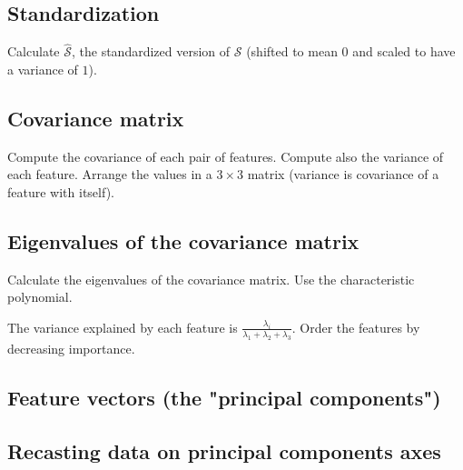 \documentclass[]{article}
\begin{document}
	\subsection{Standardization}
	Calculate $\hat{\mathcal{S}}$, the standardized version of $\mathcal{S}$ (shifted to mean $0$ and scaled to have a variance of $1$).
	
	\subsection{Covariance matrix}
	Compute the covariance of each pair of features.
	Compute also the variance of each feature.
	Arrange the values in a $3 \times 3$ matrix (variance is covariance of a feature with itself).
	
	\subsection{Eigenvalues of the covariance matrix}
	Calculate the eigenvalues of the covariance matrix.
	Use the characteristic polynomial.
	
	The variance explained by each feature is $\frac{\lambda_i}{\lambda_1+\lambda_2+\lambda_3}$.
	Order the features by decreasing importance.
	
	\subsection{Feature vectors (the "principal components")}
	\subsection{Recasting data on principal components axes}
\end{document}
